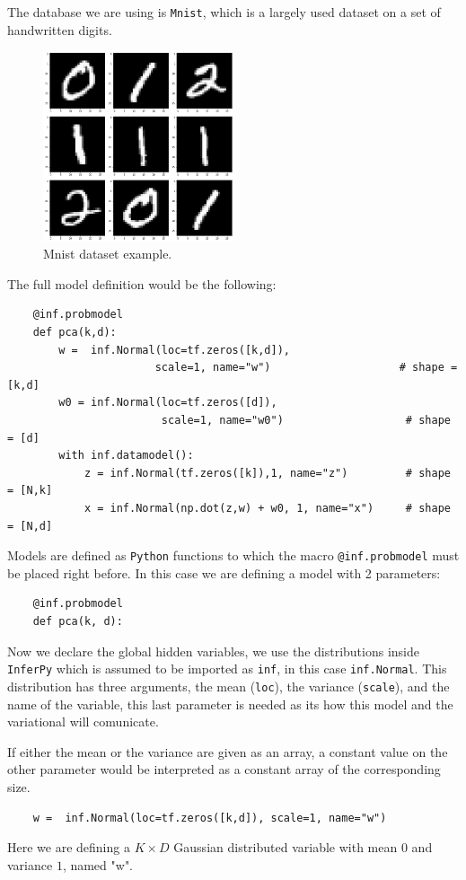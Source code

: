   The database we are using is \texttt{Mnist}, which is a largely used dataset on a set of handwritten digits.

  \begin{figure}[h!]
    \centering
    \includegraphics[width=0.5\textwidth]{Chapters/InferPy/mnist.png}
    \caption{Mnist dataset example.}
\end{figure}

The full model definition would be the following:
\begin{verbatim}
    @inf.probmodel
    def pca(k,d):
        w =  inf.Normal(loc=tf.zeros([k,d]),
                       scale=1, name="w")                    # shape = [k,d]
        w0 = inf.Normal(loc=tf.zeros([d]),
                        scale=1, name="w0")                   # shape = [d]
        with inf.datamodel():
            z = inf.Normal(tf.zeros([k]),1, name="z")         # shape = [N,k]
            x = inf.Normal(np.dot(z,w) + w0, 1, name="x")     # shape = [N,d]
\end{verbatim}

Models are defined as \texttt{Python} functions to which the macro \texttt{@inf.probmodel} must be placed right before. In this case we are defining a model with 2 parameters:

\begin{verbatim}
    @inf.probmodel
    def pca(k, d):
\end{verbatim}

Now we declare the global hidden variables, we use the distributions inside \texttt{InferPy} which is assumed to be imported as \texttt{inf}, in this case \texttt{inf.Normal}. This distribution has three arguments, the mean (\texttt{loc}), the variance (\texttt{scale}), and the name of the variable, this last parameter is needed as its how this model and the variational will comunicate.

If either the mean or the variance are given as an array, a constant value on the other parameter would be interpreted as a constant array of the corresponding size.
\begin{verbatim}
    w =  inf.Normal(loc=tf.zeros([k,d]), scale=1, name="w")                   
\end{verbatim}
Here we are defining a \( K\times D \)  Gaussian distributed variable with mean \( 0 \) and variance \( 1 \), named "w".


